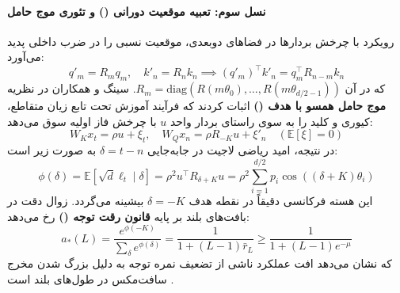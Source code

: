 \paragraph*{نسل سوم: تعبیه موقعیت دورانی () و تئوری موج حامل}
رویکرد  \cite{su2024roformer} با چرخش بردارها در فضاهای دوبعدی، موقعیت نسبی را در ضرب داخلی پدید می‌آورد:
\begin{equation}
    q'_m = R_m q_m, \quad k'_n = R_n k_n \implies (q'_m)^\top k'_n = q_m^\top R_{n-m} k_n
\end{equation}
که در آن $R_m = \text{diag}(R(m\theta_0), \dots, R(m\theta_{d/2-1}))$. سینگ و همکاران \cite{singh2026relative} در نظریه \textbf{موج حامل همسو با هدف ()} اثبات کردند که فرآیند آموزش تحت تابع زیان متقاطع، کیوری و کلید را به سوی راستای بردار واحد $u$ با چرخش فاز اولیه سوق می‌دهد:
\begin{equation}
    W_K x_t = \rho u + \xi_t, \quad W_Q x_n = \rho R_{-K} u + \xi'_n \quad (\mathbb{E}[\xi] = 0)
\end{equation}
در نتیجه، امید ریاضی لاجیت در جابه‌جایی $\delta = t - n$ به صورت زیر است:
\begin{equation}
    \phi(\delta) = \mathbb{E}[\sqrt{d}\ell_t \mid \delta] = \rho^2 u^\top R_{\delta + K} u = \rho^2 \sum_{i=1}^{d/2} p_i \cos((\delta + K)\theta_i)
\end{equation}
این هسته فرکانسی دقیقاً در نقطه هدف $\delta = -K$ بیشینه می‌گردد. زوال دقت در بافت‌های بلند بر پایه \textbf{قانون رقت توجه ()} رخ می‌دهد:
\begin{equation}
    a_*(L) = \frac{e^{\phi(-K)}}{\sum_{\delta} e^{\phi(\delta)}} = \frac{1}{1 + (L-1)\bar{r}_L} \ge \frac{1}{1 + (L-1)e^{-\mu}}
\end{equation}
که نشان می‌دهد افت عملکرد ناشی از تضعیف نمره توجه به دلیل بزرگ شدن مخرج سافت‌مکس در طول‌های بلند است \cite{singh2026relative}.

